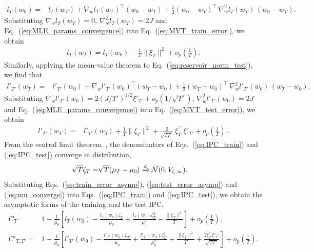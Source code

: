 \documentclass{article}
\begin{document}
\begin{align}
 l_T(w_0) =& l_T(w_T) + \nabla_w l_T(w_T)^\top (w_0 - w_T) + \frac{1}{2} (w_0 - w_T)^\top \, \nabla_w^2 l_T(w_T) \, (w_0 - w_T). 
  \label{eq:MVT_train_error}
\end{align}
Substituting $\nabla_w l_T(w_T) = 0$, $\nabla_w^2 l_T(w_T) = 2 J$ and Eq.~(\ref{eq:MLE_params_convergence}) into Eq.~(\ref{eq:MVT_train_error}), we obtain 
\begin{align}
 l_T(w_T) = l_T(w_0) - \frac{1}{T} \|\xi_T\|^2 + o_p\left(\frac{1}{T}\right). 
 \label{eq:train_error_asymp}
\end{align}
Similarly, applying the mean-value theorem to Eq.~(\ref{eq:reservoir_norm_test}), we find that 
\begin{align}
 l'_{T'}(w_T) =& l'_{T'}(w_0) + \nabla_w l'_{T'}(w_0)^\top (w_T - w_0) + \frac{1}{2} (w_T - w_0)^\top \, \nabla_w^2 l'_{T'}(w_0) \, (w_T - w_0). 
  \label{eq:MVT_test_error} 
\end{align}
Substituting $\nabla_w l'_{T'}(w_0) = 2(J / T')^{1/2} \xi'_{T'} + o_p(1/\sqrt{T'})$, $\nabla_w^2 l'_{T'}(w_0) = 2 J$ and Eq.~(\ref{eq:MLE_params_convergence}) into Eq.~(\ref{eq:MVT_test_error}), we obtain 
\begin{align} 
 l'_{T'}(w_T) 
  =& l'_{T'}(w_0) + \frac{1}{T} \|\xi_T\|^2 + \frac{2}{\sqrt{T T'}} \, \xi_T^\top \, \xi'_{T'} + o_p\left( \frac{1}{T} \right) \, . 
  \label{eq:test_error_asymp} 
\end{align}
From the central limit theorem~\cite{heyde1974central}, the denominators of Eqs.~(\ref{eq:IPC_train}) and (\ref{eq:IPC_test}) converge in distribution,  
\begin{align}
 \sqrt{T} \zeta_T 
  =& \sqrt{T} (\mu_T - \mu_0) \xrightarrow{d} {\cal N}(0, V_{\zeta, \infty}).
  \label{eq:mu_converge}
\end{align}
Substituting Eqs.~(\ref{eq:train_error_asymp}), (\ref{eq:test_error_asymp}) and (\ref{eq:mu_converge}) into Eqs.~(\ref{eq:IPC_train}) and (\ref{eq:IPC_test}), we obtain the asymptotic forms of the training and the test IPC, 
\begin{align} 
 C_T =& 1 - \frac{1}{\mu_0} \left[ l_T(w_0) - \frac{l_T(w_0) \zeta_T}{\mu_0} + \frac{l_T(w_0) \zeta_T^2}{\mu_0^ 2} - \frac{\|\xi_T\|^2}{T}\right] + o_p\left(\frac{1}{T}\right), 
  \label{eq:asymp_train_IPC} \\ 
 C'_{T,T'} =& 1 - \frac{1}{\mu_0} \left[ l'_{T'}(w_0) - \frac{l'_{T'}(w_0) \zeta_{T'}}{\mu_0} + \frac{l'_{T'}(w_0) \zeta_{T'}^2}{\mu_0^2} + \frac{\|\xi_T\|^2}{T} + \frac{2 \xi_T^\top \xi'_{T'}} {\sqrt{T T'}} \right] + o_p\left(\frac{1}{T}\right).
 \label{eq:asymp_test_IPC}
\end{align}
\end{document}
